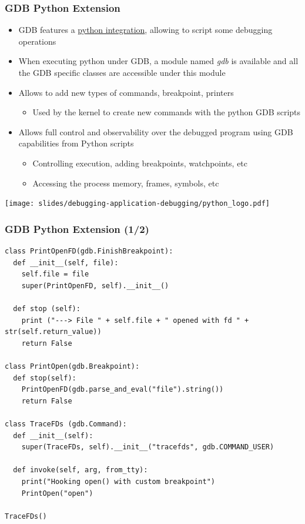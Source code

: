 \begin{frame}
  \frametitle{GDB Python Extension}
  \begin{itemize}
    \item GDB features a \href{https://sourceware.org/gdb/onlinedocs/gdb/Python.html}{python integration},
          allowing to script some debugging operations
    \item When executing python under GDB, a module named {\em gdb} is available
          and all the GDB specific classes are accessible under this module
    \item Allows to add new types of commands, breakpoint, printers
    \begin{itemize}
      \item Used by the kernel to create new commands with the python GDB scripts
    \end{itemize}
    \item Allows full control and observability over the debugged program using
          GDB capabilities from Python scripts
    \begin{itemize}
      \item Controlling execution, adding breakpoints, watchpoints, etc
      \item Accessing the process memory, frames, symbols, etc
    \end{itemize}
  \end{itemize}
  \begin{center}
    \texttt{[image: slides/debugging-application-debugging/python\_logo.pdf]}
  \end{center}
\end{frame}

\begin{frame}[fragile]
  \frametitle{GDB Python Extension (1/2)}
  \begin{block}{}
    \begin{verbatim}
class PrintOpenFD(gdb.FinishBreakpoint):
  def __init__(self, file):
    self.file = file
    super(PrintOpenFD, self).__init__()

  def stop (self):
    print ("---> File " + self.file + " opened with fd " + str(self.return_value))
    return False

class PrintOpen(gdb.Breakpoint):
  def stop(self):
    PrintOpenFD(gdb.parse_and_eval("file").string())
    return False

class TraceFDs (gdb.Command):
  def __init__(self):
    super(TraceFDs, self).__init__("tracefds", gdb.COMMAND_USER)

  def invoke(self, arg, from_tty):
    print("Hooking open() with custom breakpoint")
    PrintOpen("open")

TraceFDs()
    \end{verbatim}
  \end{block}
\end{frame}

